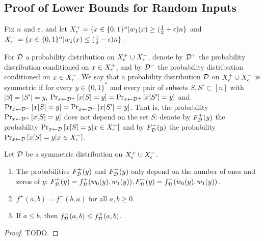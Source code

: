\subsection{Proof of Lower Bounds for Random Inputs}

Fix $n$ and $\epsilon$, and let
$X^+_\epsilon = \{x \in \{0, 1\}^n | w_1(x) \geq (\frac{1}{2}+\epsilon )n \}$
and $X^-_\epsilon = \{x \in \{0, 1\}^n | w_1(x) \leq (\frac{1}{2}-\epsilon )n \}$.

For $\mathcal{D}$ a probability distribution on $X^+_\epsilon \cup X^-_\epsilon$, denote
by $\mathcal{D}^+$ the probability distribution conditioned on $x \in X^+_\epsilon$,
and by $\mathcal{D}^-$ the probability distribution conditioned on $x \in X^-_\epsilon$.
We say that a probability distribution $\mathcal{D}$ on $X^+_\epsilon \cup X^-_\epsilon$ is
symmetric if for every $y \in \{0, 1\}^*$ and every pair of subsets $S, S' \subset [n]$
with $|S| = |S'| = y$, 
$\text{Pr}_{x \leftarrow \mathcal{D}^+}\left[x[S] = y\right] = \text{Pr}_{x \leftarrow \mathcal{D}^+}\left[x[S'] = y\right]$ and
$\text{Pr}_{x \leftarrow \mathcal{D}^-}\left[x[S] = y\right] = \text{Pr}_{x \leftarrow \mathcal{D}^-}\left[x[S'] = y\right]$.
That is, the probability $\text{Pr}_{x \leftarrow \mathcal{D}^+}\left[x[S] = y\right]$ does not depend
on the set $S$: denote by $F_{\mathcal{D}}^+(y)$ the probability
$\text{Pr}_{x \leftarrow \mathcal{D}}\left[x[S] = y | x \in X^+_{\epsilon}\right]$ and by $F_{\mathcal{D}}^-(y)$ the probability
$\text{Pr}_{x \leftarrow \mathcal{D}}\left[x[S] = y | x \in X^-_{\epsilon}\right]$. 

\begin{lemma}
\label{lem:symmetricproperties}
Let $\mathcal{D}$ be a symmetric distribution on $X^+_\epsilon \cup X^-_\epsilon$.

\begin{enumerate}
    \item The probabilities $F_{\mathcal{D}}^+(y)$ and $F_{\mathcal{D}}^-(y)$ only depend on the number of ones and zeros
    of $y$: $F_{\mathcal{D}}^+(y) = f_{\mathcal{D}}^+(w_0(y), w_1(y)), F_{\mathcal{D}}^-(y) = f_{\mathcal{D}}^-(w_0(y), w_1(y))$.
    \item $f^+(a, b) = f^-(b, a)$ for all $a, b \geq 0$. 
    \item If $a \leq b$, then $f^-_{\mathcal{D}}(a, b) \leq f^+_{\mathcal{D}}(a, b)$.
\end{enumerate}
\end{lemma}
\begin{proof}
    TODO. 
\end{proof}

